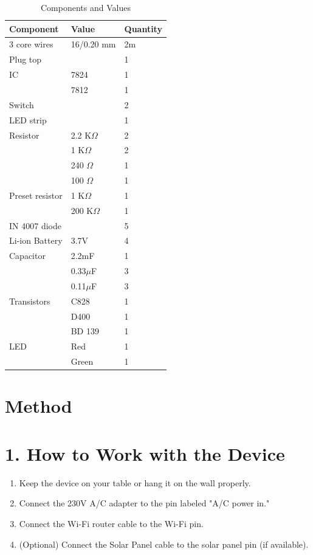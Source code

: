\documentclass[twocolumn]{article}
\begin{document}
\begin{table}[htbp]
    \centering
    \caption{Components and Values}
    \begin{tabular}{lll}
        \toprule
        \textbf{Component} & \textbf{Value} & \textbf{Quantity} \\
        \midrule
        3 core wires & 16/0.20 mm & 2m \\
        Plug top & & 1 \\
        IC & 7824 & 1 \\
        & 7812 & 1 \\
        Switch & & 2 \\
        LED strip & & 1 \\
        Resistor & 2.2 K$\Omega$ & 2 \\
        & 1 K$\Omega$ & 2 \\
        & 240 $\Omega$ & 1 \\
        & 100 $\Omega$ & 1 \\
        Preset resistor & 1 K$\Omega$ & 1 \\
        & 200 K$\Omega$ & 1 \\
        IN 4007 diode & & 5 \\
        Li-ion Battery & 3.7V & 4 \\
        Capacitor & 2.2mF & 1 \\
        & 0.33$\mu$F & 3 \\
        & 0.11$\mu$F & 3 \\
        Transistors & C828 & 1 \\
        & D400 & 1 \\
        & BD 139 & 1 \\
        LED & Red & 1 \\
        & Green & 1 \\
        \bottomrule
    \end{tabular}
\end{table}

\section*{Method}
\section*{1. How to Work with the Device}
\begin{enumerate}
    \item Keep the device on your table or hang it on the wall properly.
    \item Connect the 230V A/C adapter to the pin labeled "A/C power in."
    \item Connect the Wi-Fi router cable to the Wi-Fi pin.
    \item (Optional) Connect the Solar Panel cable to the solar panel pin (if available).
\end{enumerate}
\end{document}
